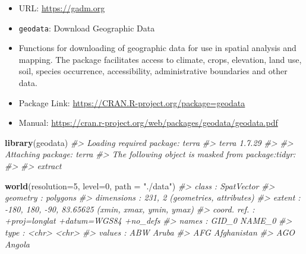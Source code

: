 \documentclass[
  xelatex, ja=standard]{bxjsbook}
\newenvironment{Shaded}{\begin{snugshade}}{\end{snugshade}}
\newcommand{\AttributeTok}[1]{\textcolor[rgb]{0.13,0.29,0.53}{#1}}
\newcommand{\CommentTok}[1]{\textcolor[rgb]{0.56,0.35,0.01}{\textit{#1}}}
\newcommand{\DecValTok}[1]{\textcolor[rgb]{0.00,0.00,0.81}{#1}}
\newcommand{\FunctionTok}[1]{\textcolor[rgb]{0.13,0.29,0.53}{\textbf{#1}}}
\newcommand{\NormalTok}[1]{#1}
\newcommand{\StringTok}[1]{\textcolor[rgb]{0.31,0.60,0.02}{#1}}
\providecommand{\tightlist}{%
  \setlength{\itemsep}{0pt}\setlength{\parskip}{0pt}}
\theoremstyle{definition}
\theoremstyle{definition}
\theoremstyle{definition}
\theoremstyle{definition}
\theoremstyle{remark}
\begin{document}
\begin{itemize}
\tightlist
\item
  URL: \url{https://gadm.org}
\item
  \texttt{geodata}: Download Geographic Data
\item
  Functions for downloading of geographic data for use in spatial analysis and mapping. The package facilitates access to climate, crops, elevation, land use, soil, species occurrence, accessibility, administrative boundaries and other data.
\item
  Package Link: \url{https://CRAN.R-project.org/package=geodata}
\item
  Manual: \url{https://cran.r-project.org/web/packages/geodata/geodata.pdf}
\end{itemize}

\begin{Shaded}
\begin{Highlighting}[]
\FunctionTok{library}\NormalTok{(geodata)}
\CommentTok{\#\textgreater{} Loading required package: terra}
\CommentTok{\#\textgreater{} terra 1.7.29}
\CommentTok{\#\textgreater{} }
\CommentTok{\#\textgreater{} Attaching package: \textquotesingle{}terra\textquotesingle{}}
\CommentTok{\#\textgreater{} The following object is masked from \textquotesingle{}package:tidyr\textquotesingle{}:}
\CommentTok{\#\textgreater{} }
\CommentTok{\#\textgreater{}     extract}
\end{Highlighting}
\end{Shaded}

\begin{Shaded}
\begin{Highlighting}[]
\FunctionTok{world}\NormalTok{(}\AttributeTok{resolution=}\DecValTok{5}\NormalTok{, }\AttributeTok{level=}\DecValTok{0}\NormalTok{, }\AttributeTok{path =} \StringTok{"./data"}\NormalTok{)}
\CommentTok{\#\textgreater{}  class       : SpatVector }
\CommentTok{\#\textgreater{}  geometry    : polygons }
\CommentTok{\#\textgreater{}  dimensions  : 231, 2  (geometries, attributes)}
\CommentTok{\#\textgreater{}  extent      : {-}180, 180, {-}90, 83.65625  (xmin, xmax, ymin, ymax)}
\CommentTok{\#\textgreater{}  coord. ref. : +proj=longlat +datum=WGS84 +no\_defs }
\CommentTok{\#\textgreater{}  names       : GID\_0      NAME\_0}
\CommentTok{\#\textgreater{}  type        : \textless{}chr\textgreater{}       \textless{}chr\textgreater{}}
\CommentTok{\#\textgreater{}  values      :   ABW       Aruba}
\CommentTok{\#\textgreater{}                  AFG Afghanistan}
\CommentTok{\#\textgreater{}                  AGO      Angola}
\end{Highlighting}
\end{Shaded}
\end{document}
